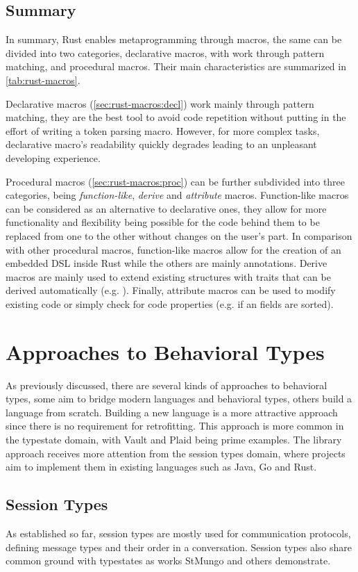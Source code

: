 \subsection{Summary}
In summary, Rust enables metaprogramming through macros, the same can be divided into two categories,
declarative macros, with work through pattern matching, and procedural macros.
Their main characteristics are summarized in \autoref{tab:rust-macros}.

Declarative macros (\autoref{sec:rust-macros:decl}) work mainly through pattern matching,
they are the best tool to avoid code repetition without putting in the effort of writing a token parsing macro.
However, for more complex tasks, declarative macro's readability quickly degrades leading to an unpleasant developing experience.

Procedural macros (\autoref{sec:rust-macros:proc}) can be further subdivided into three categories,
being \emph{function-like}, \emph{derive} and \emph{attribute} macros.
Function-like macros can be considered as an alternative to declarative ones,
they allow for more functionality and flexibility being possible for the code behind them
to be replaced from one to the other without changes on the user's part.
In comparison with other procedural macros, function-like macros allow for the creation of an embedded DSL inside Rust while the others are mainly annotations.
Derive macros are mainly used to extend existing structures with traits that can be derived automatically (e.g. ).
Finally, attribute macros can be used to modify existing code or simply check for code properties (e.g. if an  fields are sorted).

\section{Approaches to Behavioral Types}\label{sec:behavioral-approaches}

As previously discussed, there are several kinds of approaches to behavioral types,
some aim to bridge modern languages and behavioral types,
others build a language from scratch.
Building a new language is a more attractive approach since there is no requirement for retrofitting.
This approach is more common in the typestate domain, with Vault and Plaid being prime examples.
The library approach receives more attention from the session types domain,
where projects aim to implement them in existing languages such as Java, Go and Rust.

\subsection{Session Types}
As established so far, session types are mostly used for communication protocols,
defining message types and their order in a conversation.
Session types also share common ground with typestates as works StMungo \autocite{Dardha2017, Kouzapas2018, Voinea2020}
and others \autocite{Gay2015, Vasconcelos2017} demonstrate.


